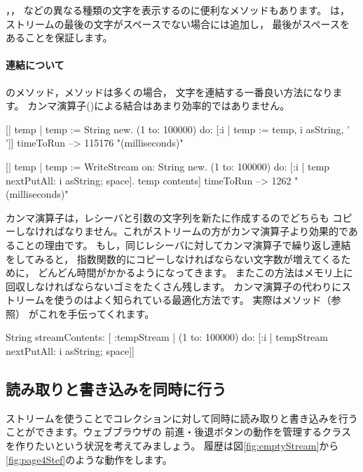 \documentclass[a4paper,10pt,twoside]{book}
\begin{document}
，， 
などの異なる種類の文字を表示するのに便利なメソッドもあります。
は，ストリームの最後の文字がスペースでない場合には追加し，
最後がスペースをあることを保証します。

\paragraph{連結について}

のメソッド，メソッドは多くの場合，
文字を連結する一番良い方法になります。
カンマ演算子(\ct{,})による結合はあまり効率的ではありません。


\begin{code}{}
[| temp |
  temp := String new.
  (1 to: 100000)
    do: [:i | temp := temp, i asString, ' ']] timeToRun --> 115176 "(milliseconds)"

[| temp |
  temp := WriteStream on: String new.
  (1 to: 100000)
    do: [:i | temp nextPutAll: i asString; space].
  temp contents] timeToRun --> 1262 "(milliseconds)"
\end{code}

カンマ演算子は，レシーバと引数の文字列を新たに作成するのでどちらも
コピーしなければなりません。これがストリームの方がカンマ演算子より効果的であることの理由です。
もし，同じレシーバに対してカンマ演算子で繰り返し連結をしてみると，
指数関数的にコピーしなければならない文字数が増えてくるために，
どんどん時間がかかるようになってきます。
またこの方法はメモリ上に回収しなければならないゴミをたくさん残します。
カンマ演算子の代わりにストリームを使うのはよく知られている最適化方法です。
実際はメソッド（\pageref{sec:streamContents}参照）
がこれを手伝ってくれます。


\begin{code}{}
String streamContents: [ :tempStream |
  (1 to: 100000)
       do: [:i | tempStream nextPutAll: i asString; space]] 
\end{code}

\subsection{読み取りと書き込みを同時に行う}

ストリームを使うことでコレクションに対して同時に読み取りと書き込みを行うことができます。ウェブブラウザの
前進・後退ボタンの動作を管理するクラスを作りたいという状況を考えてみましょう。
履歴は図\ref{fig:emptyStream}から\ref{fig:page4Stef}のような動作をします。
\end{document}

